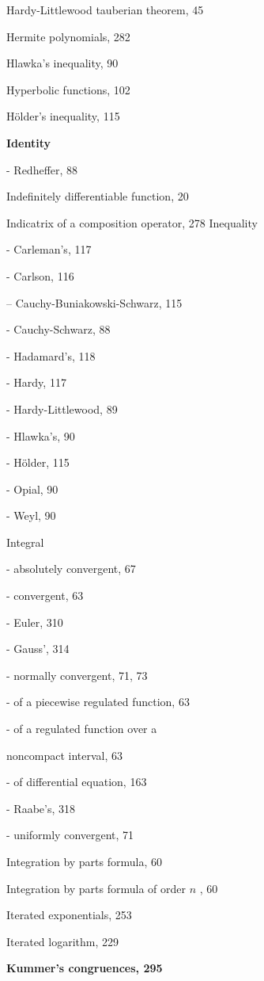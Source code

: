 Hardy-Littlewood tauberian theorem, 45

Hermite polynomials, 282

Hlawka's inequality, 90

Hyperbolic functions, 102

Hölder's inequality, 115

\par\noindent\textbf{Identity}\par

- Redheffer, 88

Indefinitely differentiable function, 20

Indicatrix of a composition operator, 278 Inequality

- Carleman's, 117

- Carlson, 116

-- Cauchy-Buniakowski-Schwarz, 115

- Cauchy-Schwarz, 88

- Hadamard's, 118

- Hardy, 117

- Hardy-Littlewood, 89

- Hlawka's, 90

- Hölder, 115

- Opial, 90

- Weyl, 90

Integral

- absolutely convergent, 67

- convergent, 63

- Euler, 310

- Gauss', 314

- normally convergent, 71, 73

- of a piecewise regulated function, 63

- of a regulated function over a

noncompact interval, 63

- of differential equation, 163

- Raabe's, 318

- uniformly convergent, 71

Integration by parts formula, 60

Integration by parts formula of order \(n\) , 60

Iterated exponentials, 253

Iterated logarithm, 229

\par\noindent\textbf{Kummer's congruences, 295}\par

